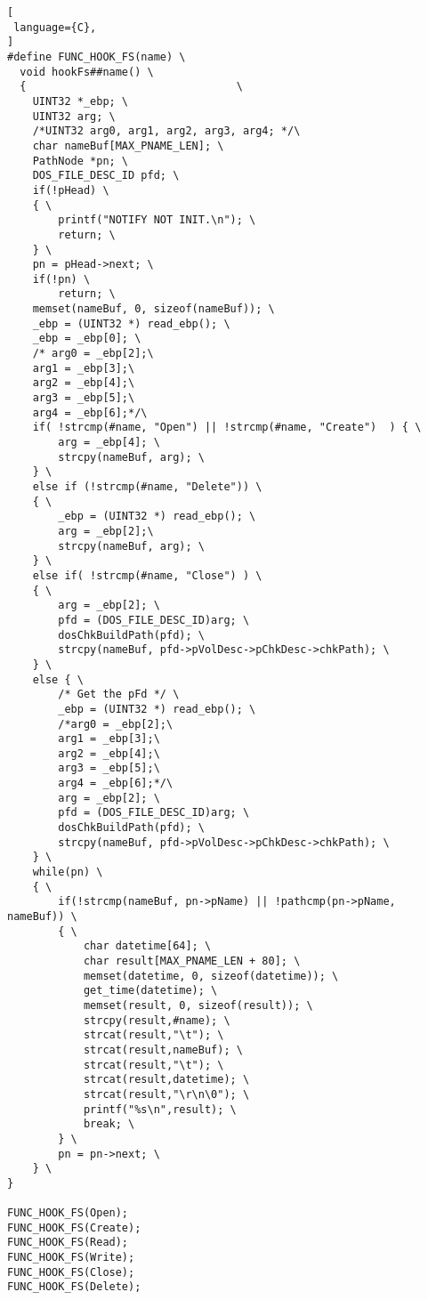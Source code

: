 \begin{lstlisting}[
 language={C},
]
#define FUNC_HOOK_FS(name) \
  void hookFs##name() \
  {                                 \
	UINT32 *_ebp; \
	UINT32 arg; \
	/*UINT32 arg0, arg1, arg2, arg3, arg4; */\
	char nameBuf[MAX_PNAME_LEN]; \
	PathNode *pn; \
	DOS_FILE_DESC_ID pfd; \
	if(!pHead) \
	{ \
		printf("NOTIFY NOT INIT.\n"); \
		return; \
	} \
	pn = pHead->next; \
	if(!pn) \
		return; \
	memset(nameBuf, 0, sizeof(nameBuf)); \
	_ebp = (UINT32 *) read_ebp(); \
	_ebp = _ebp[0]; \
	/* arg0 = _ebp[2];\
	arg1 = _ebp[3];\
	arg2 = _ebp[4];\
	arg3 = _ebp[5];\
	arg4 = _ebp[6];*/\
	if( !strcmp(#name, "Open") || !strcmp(#name, "Create")  ) { \
		arg = _ebp[4]; \
		strcpy(nameBuf, arg); \
	} \
	else if (!strcmp(#name, "Delete")) \
	{ \
		_ebp = (UINT32 *) read_ebp(); \
		arg = _ebp[2];\
		strcpy(nameBuf, arg); \
	} \
	else if( !strcmp(#name, "Close") ) \
	{ \
		arg = _ebp[2]; \
		pfd = (DOS_FILE_DESC_ID)arg; \
		dosChkBuildPath(pfd); \
		strcpy(nameBuf, pfd->pVolDesc->pChkDesc->chkPath); \
	} \
	else { \
		/* Get the pFd */ \
		_ebp = (UINT32 *) read_ebp(); \
		/*arg0 = _ebp[2];\
		arg1 = _ebp[3];\
		arg2 = _ebp[4];\
		arg3 = _ebp[5];\
		arg4 = _ebp[6];*/\
		arg = _ebp[2]; \
		pfd = (DOS_FILE_DESC_ID)arg; \
		dosChkBuildPath(pfd); \
		strcpy(nameBuf, pfd->pVolDesc->pChkDesc->chkPath); \
	} \
	while(pn) \
	{ \
		if(!strcmp(nameBuf, pn->pName) || !pathcmp(pn->pName, nameBuf)) \
		{ \
			char datetime[64]; \
			char result[MAX_PNAME_LEN + 80]; \
			memset(datetime, 0, sizeof(datetime)); \
			get_time(datetime); \
			memset(result, 0, sizeof(result)); \
			strcpy(result,#name); \
			strcat(result,"\t"); \
			strcat(result,nameBuf); \
			strcat(result,"\t"); \
			strcat(result,datetime); \
			strcat(result,"\r\n\0"); \
			printf("%s\n",result); \
			break; \
		} \
		pn = pn->next; \
	} \
}

FUNC_HOOK_FS(Open);
FUNC_HOOK_FS(Create);
FUNC_HOOK_FS(Read);
FUNC_HOOK_FS(Write);
FUNC_HOOK_FS(Close);
FUNC_HOOK_FS(Delete);
\end{lstlisting}
